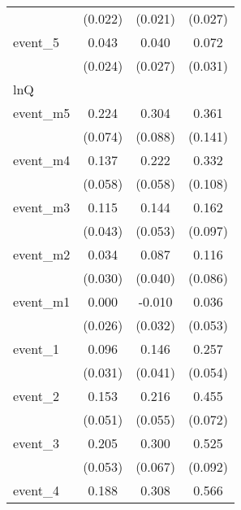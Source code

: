 {\begin{tabular}{l*{3}{c}}
            &     (0.022)         &     (0.021)         &     (0.027)         \\
[1em]
event\_5     &       0.043         &       0.040         &       0.072\sym{*}  \\
            &     (0.024)         &     (0.027)         &     (0.031)         \\
\hline
lnQ         &                     &                     &                     \\
event\_m5    &       0.224\sym{**} &       0.304\sym{***}&       0.361\sym{*}  \\
            &     (0.074)         &     (0.088)         &     (0.141)         \\
[1em]
event\_m4    &       0.137\sym{*}  &       0.222\sym{***}&       0.332\sym{**} \\
            &     (0.058)         &     (0.058)         &     (0.108)         \\
[1em]
event\_m3    &       0.115\sym{**} &       0.144\sym{**} &       0.162         \\
            &     (0.043)         &     (0.053)         &     (0.097)         \\
[1em]
event\_m2    &       0.034         &       0.087\sym{*}  &       0.116         \\
            &     (0.030)         &     (0.040)         &     (0.086)         \\
[1em]
event\_m1    &       0.000         &      -0.010         &       0.036         \\
            &     (0.026)         &     (0.032)         &     (0.053)         \\
[1em]
event\_1     &       0.096\sym{**} &       0.146\sym{***}&       0.257\sym{***}\\
            &     (0.031)         &     (0.041)         &     (0.054)         \\
[1em]
event\_2     &       0.153\sym{**} &       0.216\sym{***}&       0.455\sym{***}\\
            &     (0.051)         &     (0.055)         &     (0.072)         \\
[1em]
event\_3     &       0.205\sym{***}&       0.300\sym{***}&       0.525\sym{***}\\
            &     (0.053)         &     (0.067)         &     (0.092)         \\
[1em]
event\_4     &       0.188\sym{**} &       0.308\sym{***}&       0.566\sym{***}\\

\end{tabular}}
